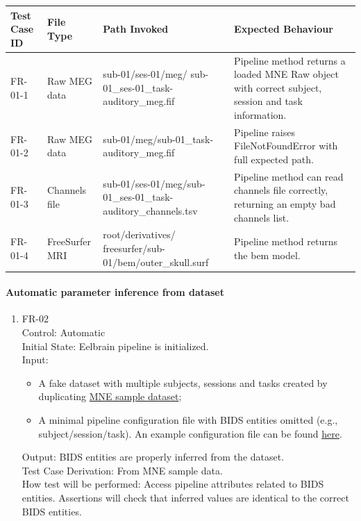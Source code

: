 \documentclass[12pt, titlepage]{article}
\begin{document}
\begin{tabularx}{\textwidth}{p{2cm}p{2cm}p{4.5cm}X}
\toprule 
    \textbf{Test Case ID} & \textbf{File Type} & \textbf{Path Invoked} & \textbf{Expected Behaviour} \\
\midrule
    FR-01-1 & Raw MEG data & sub-01/ses-01/meg/ sub-01\_ses-01\_task-auditory\_meg.fif & Pipeline method returns a loaded MNE Raw object with correct subject, session and task information. \\

    FR-01-2 & Raw MEG data & sub-01/meg/sub-01\_task-auditory\_meg.fif & Pipeline raises FileNotFoundError with full expected path. \\

    FR-01-3 & Channels file & sub-01/ses-01/meg/sub-01\_ses-01\_task-auditory\_channels.tsv & Pipeline method can read channels file correctly, returning an empty bad channels list. \\

    FR-01-4 & FreeSurfer MRI & {root}/derivatives/ freesurfer/sub-01/bem/outer\_skull.surf & Pipeline method returns the bem model. \\
\bottomrule
\end{tabularx}


\paragraph{Automatic parameter inference from dataset}


\begin{enumerate}


\item{FR-02\\}
    Control: Automatic \\
    Initial State: Eelbrain pipeline is initialized. \\
    Input: 
        \begin{itemize}
            \item A fake dataset with multiple subjects, sessions and tasks created by duplicating \href{https://mne.tools/stable/documentation/datasets.html#sample}{MNE sample dataset};
            \item A minimal pipeline configuration file with BIDS entities omitted (e.g., subject/session/task). An example configuration file can be found \href{https://github.com/Eelbrain/Eelbrain/blob/main/examples/imagenet/imagenet.py}{here}.
        \end{itemize}
    Output: BIDS entities are properly inferred from the dataset. \\
    Test Case Derivation: From MNE sample data. \\
    How test will be performed: Access pipeline attributes related to BIDS entities. Assertions will check that inferred values are identical to the correct BIDS entities.


\end{enumerate}
\end{document}
